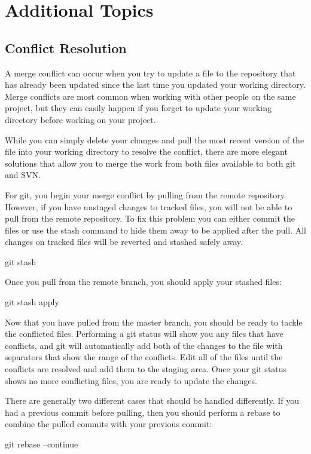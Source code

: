\documentclass[oneside]{book}
\begin{document}
\chapter{Additional Topics}
    
\section{Conflict Resolution}
\label{sec:conflict-resolution}
A merge conflict can occur when you try to update a file to the repository that has already been updated since the last time you updated your working directory. Merge conflicts are most common when working with other people on the same project, but they can easily happen if you forget to update your working directory before working on your project. 

While you can simply delete your changes and pull the most recent version of the file into your working directory to resolve the conflict, there are more elegant solutions that allow you to merge the work from both files available to both git and SVN.

For git, you begin your merge conflict by pulling from the remote repository. However, if you have unstaged changes to tracked files, you will not be able to pull from the remote repository. To fix this problem you can either commit the files or use the stash command to hide them away to be applied after the pull. All changes on tracked files will be reverted and stashed safely away.
    \begin{gitcode}
    git stash
    \end{gitcode}
    
Once you pull from the remote branch, you should apply your stashed files:
    \begin{gitcode}
    git stash apply
    \end{gitcode}
    
Now that you have pulled from the master branch, you should be ready to tackle the conflicted files. Performing a git status will show you any files that have conflicts, and git will automatically add both of the changes to the file with separators that show the range of the conflicts. Edit all of the files until the conflicts are resolved and add them to the staging area. Once your git status shows no more conflicting files, you are ready to update the changes. 

\newpage
There are generally two different cases that should be handled differently. If you had a previous commit before pulling, then you should perform a rebase to combine the pulled commits with your previous commit:
    \begin{gitcode}
    git rebase --continue
    \end{gitcode}
\end{document}
